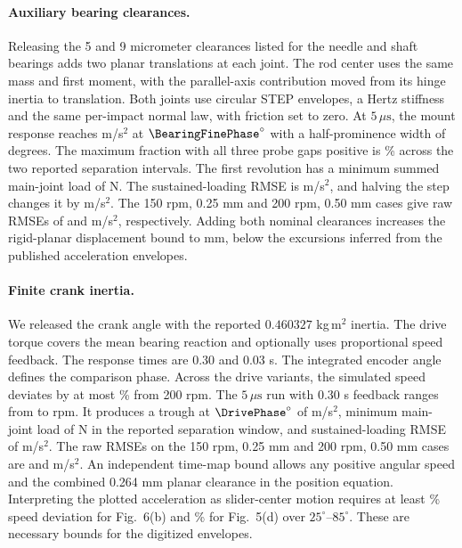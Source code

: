 \paragraph{Auxiliary bearing clearances.}
Releasing the 5 and 9 micrometer clearances listed for the needle and
shaft bearings adds two planar translations at each joint. The rod
center uses the same mass and first moment, with the parallel-axis
contribution moved from its hinge inertia to translation. Both joints
use circular STEP envelopes, a Hertz stiffness and the same per-impact
normal law, with friction set to zero. At \(5\,\mu\mathrm{s}\), the mount response reaches
\BearingFinePeak{} m/s\(^{2}\) at \(\BearingFinePhase^\circ\) with a
half-prominence width of \BearingFineWidth{} degrees. The maximum
fraction with all three probe gaps positive is \BearingFineOpen\%
across the two reported separation intervals. The first revolution
has a minimum summed main-joint load of \BearingFineLoad{} N.
The sustained-loading RMSE is \BearingFineQuiet{} m/s\(^{2}\), and
halving the step changes it by \BearingQuietDelta{} m/s\(^{2}\).
The 150 rpm,
0.25 mm and 200 rpm, 0.50 mm cases give raw RMSEs of \BearingTransferLow{}
and \BearingTransferLarge{} m/s\(^{2}\), respectively. Adding both
nominal clearances increases the rigid-planar displacement bound to
\BearingRigidBound{} mm, below the excursions inferred from the
published acceleration envelopes.
\fi

\ifdefined\DrivePhase
\paragraph{Finite crank inertia.}
We released the crank angle with the reported \(0.460327\)
kg\,m\(^{2}\) inertia. The drive torque covers the mean bearing reaction
and optionally uses proportional speed feedback. The response times are
0.30 and 0.03 s. The integrated encoder angle defines the comparison
phase. Across the drive variants, the simulated speed deviates by at most
\DriveMaxDeviation\% from 200 rpm. The \(5\,\mu\mathrm{s}\) run with
0.30 s feedback ranges from \DriveSpeedLower{} to \DriveSpeedUpper{} rpm.
It produces a trough at \(\DrivePhase^\circ\) of \DrivePeak{} m/s\(^{2}\),
minimum main-joint load of \DriveLoad{} N in the reported separation
window, and sustained-loading RMSE of \DriveQuiet{} m/s\(^{2}\).
The raw RMSEs on the 150 rpm, 0.25 mm and 200 rpm, 0.50 mm cases are
\DriveTransferLow{} and \DriveTransferLarge{} m/s\(^{2}\).
An independent time-map bound allows any positive angular speed
and the combined 0.264 mm planar clearance in the position equation.
Interpreting the plotted acceleration as slider-center motion requires
at least \DriveBoundFigSix\% speed deviation for Fig.~6(b) and
\DriveBoundFigFive\% for Fig.~5(d) over \(25^\circ\)--\(85^\circ\).
These are necessary bounds for the digitized envelopes.
\fi
